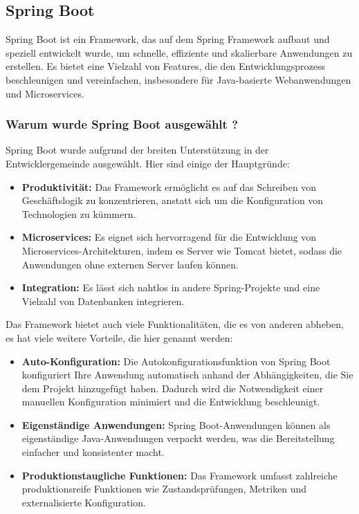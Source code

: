 \subsection{Spring Boot}

Spring Boot ist ein Framework, das auf dem Spring Framework aufbaut und speziell entwickelt wurde, um schnelle, effiziente und skalierbare Anwendungen zu erstellen. Es bietet eine Vielzahl von Features, die den Entwicklungsprozess beschleunigen und vereinfachen, insbesondere für Java-basierte Webanwendungen und Microservices.

\subsubsection{Warum wurde Spring Boot ausgewählt ?}
Spring Boot wurde aufgrund der breiten Unterstützung in der Entwicklergemeinde ausgewählt. Hier sind einige der Hauptgründe:
\begin{itemize}
	\item \textbf{Produktivität:} Das Framework ermöglicht es auf das Schreiben von Geschäftslogik zu konzentrieren, anstatt sich um die Konfiguration von Technologien zu kümmern.
	\item \textbf{Microservices:} Es eignet sich hervorragend für die Entwicklung von Microservices-Architekturen, indem es Server wie Tomcat bietet, sodass die Anwendungen ohne externen Server laufen können.
	\item \textbf{Integration:} Es lässt sich nahtlos in andere Spring-Projekte und eine Vielzahl von Datenbanken integrieren.
\end{itemize}
Das Framework bietet auch viele Funktionalitäten, die es von anderen abheben, es hat viele weitere Vorteile, die hier genannt werden:

\begin{itemize}
	\item \textbf{Auto-Konfiguration:} Die Autokonfigurationsfunktion von Spring Boot konfiguriert Ihre Anwendung automatisch anhand der Abhängigkeiten, die Sie dem Projekt hinzugefügt haben. Dadurch wird die Notwendigkeit einer manuellen Konfiguration minimiert und die Entwicklung beschleunigt.
	\item \textbf{Eigenständige Anwendungen:} Spring Boot-Anwendungen können als eigenständige Java-Anwendungen verpackt werden, was die Bereitstellung einfacher und konsistenter macht.
	\item \textbf{Produktionstaugliche Funktionen:} Das Framework umfasst zahlreiche produktionsreife Funktionen wie Zustandsprüfungen, Metriken und externalisierte Konfiguration.	
\end{itemize}

